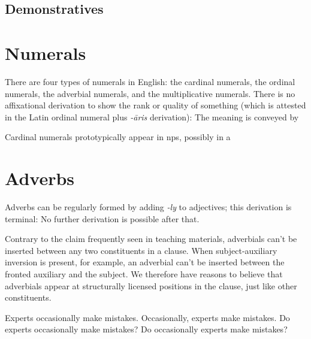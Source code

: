\documentclass[UTF8, a4paper, oneside, scheme=plain, 12pt]{ctexbook}
\newcommand{\form}[1]{\emph{#1}}
\begin{document}
\subsection{Demonstratives}

\section{Numerals}

There are four types of numerals in English:
the cardinal numerals, 
the ordinal numerals,
the adverbial numerals,
and the multiplicative numerals.
There is no affixational derivation to show the rank or quality of something 
(which is attested in the Latin ordinal numeral plus \form{-āris} derivation):
The meaning is conveyed by 

Cardinal numerals prototypically appear in \acs{np}s,
possibly in a 

\section{Adverbs}\label{sec:pos.adverb}

Adverbs can be regularly formed by adding \form{-ly} to adjectives;
this derivation is terminal:
No further derivation is possible after that.

Contrary to the claim frequently seen in teaching materials, 
adverbials can't be inserted between any two constituents in a clause.
When subject-auxiliary inversion is present, 
for example, 
an adverbial can't be inserted between the fronted auxiliary and the subject.
We therefore have reasons to believe that adverbials appear at structurally licensed positions in the clause, 
just like other constituents.

\begin{exe}
    \ex Experts occasionally make mistakes.
    \ex Occasionally, experts make mistakes.
    \ex Do experts occasionally make mistakes?
    \ex *Do occasionally experts make mistakes?
\end{exe}
\end{document}
